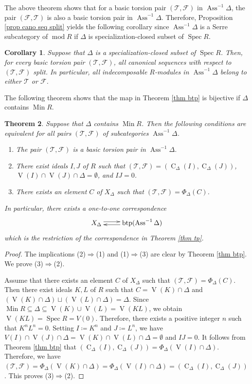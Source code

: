 \documentclass{amsart}
\newtheorem{thm}{Theorem}[section]
\newtheorem{cor}[thm]{Corollary}
\theoremstyle{definition}
\theoremstyle{remark}
\def\Ass{\operatorname{Ass}}
\def\btp{\operatorname{btp}}
\def\CC{\operatorname{C}}
\def\F{\mathcal{F}}
\def\Min{\operatorname{Min}}
\def\mod{\operatorname{mod}}
\def\Spec{\operatorname{Spec}}
\def\T{\mathcal{T}}
\def\V{\operatorname{V}}
\begin{document}
The above theorem shows that for a basic torsion pair $(\T,\F)$ in $\Ass^{-1}\Delta$, the pair $(\F,\T)$ is also a basic torsion pair in $\Ass^{-1}\Delta$. Therefore, Proposition \ref{prop cano seq split} yields the following corollary since $\Ass^{-1}\Delta$ is a Serre subcategory of $\mod R$ if $\Delta$ is specialization-closed subset of $\Spec R$.

\begin{cor}\label{cor Delta spcl}
Suppose that $\Delta$ is a specialization-closed subset of $\Spec R$. Then, for every basic torsion pair $(\T,\F)$, all canonical sequences with respect to $(\T,\F)$ split. In particular, all indecomposable $R$-modules in $\Ass^{-1}\Delta$ belong to either $\T$ or $\F$.
\end{cor}

The following theorem shows that the map in Theorem \ref{thm btp} is bijective if $\Delta$ contains $\Min R$.

\begin{thm}\label{thm btp min}
Suppose that $\Delta$ contains $\Min R$. Then the following conditions are equivalent for all pairs $(\T,\F)$ of subcategories $\Ass^{-1}\Delta$.
\begin{enumerate}[\rm(1)]
\item 
The pair $(\T,\F)$ is a basic torsion pair in $\Ass^{-1}\Delta$.
\item 
There exist ideals $I,J$ of $R$ such that $(\T,\F)=(\CC_\Delta(I),\CC_\Delta(J))$,  $\V(I)\cap\V(J)\cap\Delta=\emptyset$, and $IJ=0$.
\item 
There exists an element $C$ of $X_\Delta$ such that $(\T,\F)=\Phi_\Delta(C)$.
\end{enumerate}
In particular, there exists a one-to-one correspondence
\[\xymatrix{X_\Delta\ar@<0.5ex>[r]&\btp(\Ass^{-1}\Delta)\ar@<0.5ex>[l]}\]
which is the restriction of the correspondence in Theorem \ref{thm tp}.
\end{thm}

\begin{proof}
The implications (2)$\Rightarrow$(1) and (1)$\Rightarrow$(3) are clear by Theorem \ref{thm btp}. We prove (3)$\Rightarrow$(2).

Assume that there exists an element $C$ of $X_\Delta$ such that $(\T,\F)=\Phi_\Delta(C)$. Then there exist ideals $K,L$ of $R$ such that $C=\V(K)\cap\Delta$ and $(\V(K)\cap\Delta)\sqcup(\V(L)\cap\Delta)=\Delta$. Since $\Min R\subseteq\Delta\subseteq\V(K)\cup\V(L)=\V(KL)$, we obtain $\V(KL)=\Spec R=V(0)$. Therefore, there exists a positive integer $n$ such that $K^nL^n=0$. Setting $I\coloneq K^n$ and $J\coloneq L^n$, we have $V(I)\cap\V(J)\cap\Delta=\V(K)\cap\V(L)\cap\Delta=\emptyset$ and $IJ=0$. It follows from Theorem \ref{thm btp} that $(\CC_\Delta(I),\CC_\Delta(J))=\Phi_\Delta(\V(I)\cap\Delta)$. Therefore, we have $(\T,\F)=\Phi_\Delta(\V(K)\cap\Delta)=\Phi_\Delta(\V(I)\cap\Delta)=(\CC_\Delta(I),\CC_\Delta(J))$. This proves (3)$\Rightarrow$(2).
\end{proof}
\end{document}
